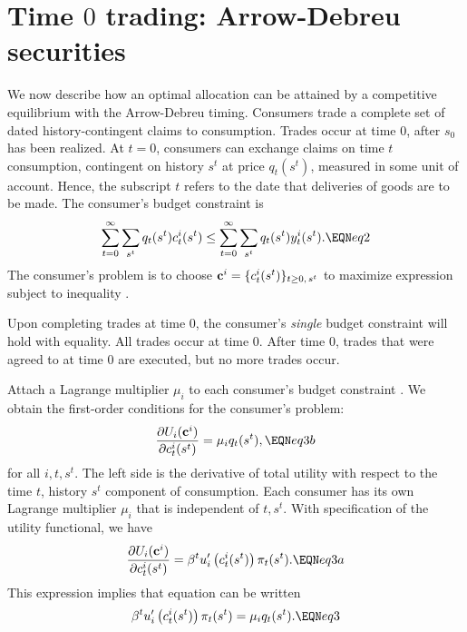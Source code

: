 \section{Time $0$ trading: Arrow-Debreu securities}\label{sec:ADtime0}%
We now describe how an optimal allocation can be attained by a
competitive equilibrium with the Arrow-Debreu timing. Consumers
trade  a complete set of dated history-contingent claims to consumption. Trades occur at time $0$, after $s_0$
has been realized. At $t=0$, consumers can exchange claims on
time $t$ consumption, contingent on history $s^t$ at price
$q_t(s^t)$, measured in some unit of account. 
Hence, the subscript $t$ refers to the date that
deliveries of goods are to be made.  The consumer's budget 
constraint is
$$ \sum_{t=0}^\infty \sum_{s^t}  q_t(s^t)  c_t^i(s^t)   \leq
   \sum_{t=0}^\infty \sum_{s^t}  q_t(s^t) y_t^i(s^t).   \EQN eq2 $$
The consumer's problem is to choose  
${\bf c}^i =\{c^i_t(s^t)\}_{t\geq0,\,s^t}$
to maximize expression  subject to inequality  .

Upon completing trades at time $0$, the consumer's
{\it single\/} budget constraint  will hold
with equality. 
All trades occur at time $0$.  After time $0$, trades that
were agreed to at time $0$ are executed, but no more trades occur.


Attach a Lagrange multiplier $\mu_i$ to each consumer's  budget constraint  .
We obtain the
first-order conditions for the consumer's problem:
$$  {\partial U_i({\bf c}^i) \over \partial c_t^i(s^t)} = \mu_i q_t(s^t), \EQN eq3b $$
for all $i, t, s^t$.
The left side is the derivative of total utility with respect to
the time $t$, history $s^t$ component of consumption.  Each
consumer has its own Lagrange multiplier $\mu_i$ that is independent of $t, s^t$. With specification  of the utility functional,
we have
$$ {\partial U_i({\bf c}^i) \over \partial c_t^i(s^t)} =   \beta^t
 u'_i\left(c_t^i(s^t)\right) \pi_t(s^t) .  \EQN eq3a $$
This expression  implies that equation  can be written
$$ \beta^t u'_i\left(c_t^i(s^t)\right) \pi_t(s^t) 
= \mu_i q_t(s^t). \EQN eq3 $$


